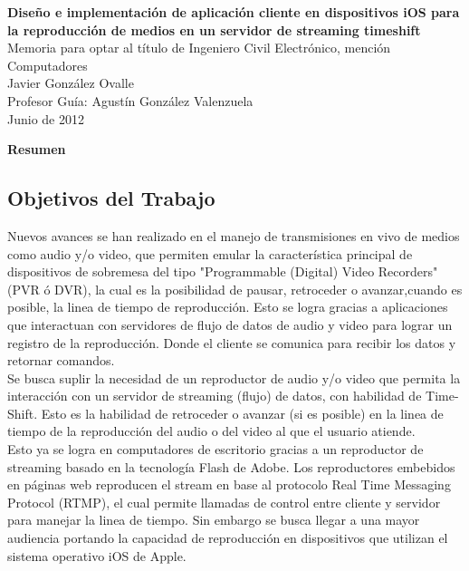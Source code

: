 \newpage
\thispagestyle{empty}
\begin{center}
 \Large \textbf{Diseño e implementación de aplicación cliente en dispositivos iOS para la reproducción de medios en un servidor de streaming timeshift}\\

\normalsize Memoria para optar al título de Ingeniero Civil Electrónico, mención Computadores \\
\normalsize Javier González Ovalle \\
\normalsize Profesor Guía: Agustín González Valenzuela \\
\normalsize Junio de 2012

\Large \textbf{Resumen}

\end{center}
\normalsize
\subsection*{Objetivos del Trabajo}
\normalsize

Nuevos avances se han realizado en el manejo de transmisiones en vivo de medios como audio y/o video, que permiten emular la característica principal de dispositivos de sobremesa del tipo "Programmable (Digital) Video Recorders" (PVR ó DVR), la cual es la posibilidad de pausar, retroceder o avanzar,cuando es posible, la linea de tiempo de reproducción. Esto se logra gracias a aplicaciones que interactuan con servidores de flujo de datos de audio y video para lograr un registro de la reproducción. Donde el cliente se comunica para recibir los datos y retornar comandos.\\ 

Se busca suplir la necesidad de un reproductor de audio y/o video que permita la interacción con un servidor de streaming (flujo) de datos, con habilidad de Time-Shift. Esto es la habilidad de retroceder o avanzar (si es posible) en la linea de tiempo de la reproducción del audio o del video al que el usuario atiende.\\

Esto ya se logra en computadores de escritorio gracias a un reproductor de streaming basado en la tecnolog\'ia Flash de Adobe. Los reproductores embebidos en p\'aginas web reproducen el stream en base al protocolo Real Time Messaging Protocol (RTMP), el cual permite llamadas de control entre cliente y servidor para manejar la linea de tiempo. Sin embargo se busca llegar a una mayor audiencia portando la capacidad de reproducci\'on en dispositivos que utilizan el sistema operativo iOS de Apple.\\

